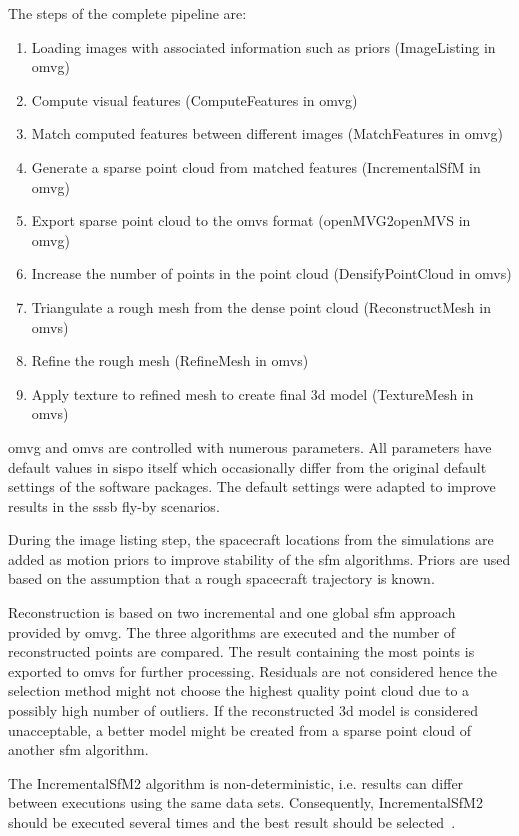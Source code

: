 The steps of the complete pipeline are:
\begin{enumerate}
    \item Loading images with associated information such as priors (ImageListing in \gls{omvg})
    \item Compute visual features (ComputeFeatures in \gls{omvg})
    \item Match computed features between different images (MatchFeatures in \gls{omvg})
    \item Generate a sparse point cloud from matched features (IncrementalSfM in \gls{omvg})
    \item Export sparse point cloud to the \gls{omvs} format (openMVG2openMVS in \gls{omvg})
    \item Increase the number of points in the point cloud (DensifyPointCloud in \gls{omvs})
    \item Triangulate a rough mesh from the dense point cloud (ReconstructMesh in \gls{omvs})
    \item Refine the rough mesh (RefineMesh in \gls{omvs})
    \item Apply texture to refined mesh to create final \gls{3d} model (TextureMesh in \gls{omvs})
\end{enumerate}

\gls{omvg} and \gls{omvs} are controlled with numerous parameters. All parameters have default values in \gls{sispo} itself which occasionally differ from the original default settings of the software packages. The default settings were adapted to improve results in the \gls{sssb} fly-by scenarios.

During the image listing step, the spacecraft locations from the simulations are added as motion priors to improve stability of the \gls{sfm} algorithms. Priors are used based on the assumption that a rough spacecraft trajectory is known.

Reconstruction is based on two incremental and one global \gls{sfm} approach provided by \gls{omvg}. The three algorithms are executed and the number of reconstructed points are compared. The result containing the most points is exported to \gls{omvs} for further processing. Residuals are not considered hence the selection method might not choose the highest quality point cloud due to a possibly high number of outliers. If the reconstructed \gls{3d} model is considered unacceptable, a better model might be created from a sparse point cloud of another \gls{sfm} algorithm.

The IncrementalSfM2 algorithm is non-deterministic, i.e. results can differ between executions using the same data sets. Consequently, IncrementalSfM2 should be executed several times and the best result should be selected~\cite{Pajusalu2019CharacterizationMapping}.

